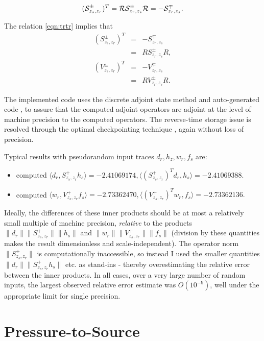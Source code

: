 \begin{equation} 
  \label{eqn:trtr}
 ({\cal S}^{\pm}_{z_s,z_r})^T = {\cal R}{\cal S}_{z_r,z_s}^{\pm}{\cal R}=
 -{\cal S}^{\mp}_{z_r,z_s}.
\end{equation}

The relation \ref{eqn:trtr} implies that
\begin{eqnarray}
  (S^{\pm}_{z_s,z_r})^T &=& -S^{\mp}_{z_r,z_s} \nonumber\\
                        &=& R S^{\pm}_{z_r,z_s}R, \nonumber\\
    (V^{\pm}_{z_s,z_r})^T &=& -V^{\mp}_{z_r,z_s} \nonumber\\
                        &=& R V^{\pm}_{z_r,z_s}R.
                            \label{eqn:trtrcomp}
\end{eqnarray}

The implemented code uses the discrete adjoint state method and auto-generated code \cite[]{TapenadeRef13}, to
assure that the computed adjoint operators are adjoint at the level of
machine precision to the computed operators. The reverse-time storage
issue is resolved through the optimal checkpointing technique
\cite[]{Griewank:book,Symes:06a-pub}, again without loss of precision.

Typical results with pseudorandom input traces $d_r, h_z, w_r, f_s$ are:
\begin{itemize}
\item computed $\langle d_r, S^+_{z_s,z_r}h_s\rangle = -2.41069174,
  \langle (S^+_{z_s,z_r})^Td_r, h_s \rangle = -2.41069388.$
\item  computed $\langle w_r, V^+_{z_s,z_r}f_s\rangle = -2.73362470,
  \langle (V^+_{z_s,z_r})^Tw_r, f_s \rangle = -2.73362136.$
\end{itemize}
Ideally, the differences of these inner products should be at most a
relatively small multiple of machine precision, {\em relative} to the
products $\|d_r\|\| S^+_{z_s,z_r}\|\|h_s\|$ and
$\|w_r\|\|V^+_{z_s,z_r}\|\|f_s\|$ (division by these quantities makes the result
dimensionless and scale-independent). The operator norm $\| S^+_{z_s,z_r}\|$ is
computationally inaccessible, so instead I used the smaller quantities
$\|d_r\|\| S^+_{z_s,z_r}h_s\|$ etc. as stand-ins - thereby
overestimating the relative error between the inner products. In all
cases, over a very large number of random inputs, the largest observed
relative error estimate was $O(10^{-9})$, well under the appropriate limit for
single precision.

\section{Pressure-to-Source}

